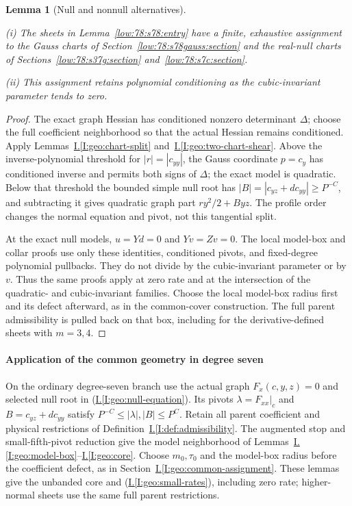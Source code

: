 \documentclass[11pt]{amsart}
\newtheorem{lemma}[theorem]{Lemma}
\theoremstyle{definition}
\theoremstyle{remark}
\numberwithin{equation}{section}
\newcommand{\partIref}[1]{\hyperref[I:#1]{I.\ref*{I:#1}}}
\newcommand{\partIeqref}[1]{\textup{(\partIref{#1})}}
\begin{document}
\begin{lemma}[Null and nonnull alternatives]\label{low:78:s78:chart-split}

\noindent\textup{(i)} The sheets in Lemma~\ref{low:78:s78:entry} have a finite, exhaustive assignment to the Gauss charts of Section~\ref{low:78:s78gauss:section} and the real-null charts of Sections~\ref{low:78:s37g:section} and~\ref{low:78:s7c:section}.

\noindent\textup{(ii)} This assignment retains polynomial conditioning as the cubic-invariant parameter tends to zero.
\end{lemma}
\begin{proof}
The exact graph Hessian has conditioned nonzero determinant $\Delta$; choose the full coefficient neighborhood so that the actual Hessian remains conditioned. Apply Lemmas~\partIref{geo:chart-split} and~\partIref{geo:two-chart-shear}. Above the inverse-polynomial threshold for $|r|=|c_{yy}|$, the Gauss coordinate $p=c_y$ has conditioned inverse and permits both signs of $\Delta$; the exact model is quadratic. Below that threshold the bounded simple null root has $|B|=|c_{yz}+dc_{yy}|\ge P^{-C}$, and subtracting it gives quadratic graph part $ry^2/2+Byz$. The profile order changes the normal equation and pivot, not this tangential split.

At the exact null models, $u=Yd=0$ and $Yv=Zv=0$. The local model-box and collar proofs use only these identities, conditioned pivots, and fixed-degree polynomial pullbacks. They do not divide by the cubic-invariant parameter or by $v$. Thus the same proofs apply at zero rate and at the intersection of the quadratic- and cubic-invariant families. Choose the local model-box radius first and its defect afterward, as in the common-cover construction. The full parent admissibility is pulled back on that box, including for the derivative-defined sheets with $m=3,4$.
\end{proof}


\paragraph{Application of the common geometry in degree seven}

On the ordinary degree-seven branch use the actual graph $F_x(c,y,z)=0$ and selected null root in \partIeqref{geo:null-equation}. Its pivots $\lambda=F_{xx}|_c$ and $B=c_{yz}+dc_{yy}$ satisfy $P^{-C}\le|\lambda|,|B|\le P^C$. Retain all parent coefficient and physical restrictions of Definition~\partIref{def:admissibility}. The augmented stop and small-fifth-pivot reduction give the model neighborhood of Lemmas~\partIref{geo:model-box}--\partIref{geo:core}. Choose $m_0,\tau_0$ and the model-box radius before the coefficient defect, as in Section~\partIref{geo:common-assignment}. These lemmas give the unbanded core and \partIeqref{geo:small-rates}, including zero rate; higher-normal sheets use the same full parent restrictions.
\end{document}

